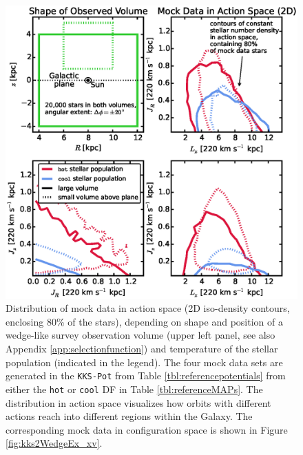 \documentclass[iop,revtex4,numberedappendix,appendixfloats]{emulateapj}
\begin{document}
\begin{figure}[!htbp]
\centering
\begin{minipage}{0.48\textwidth}
\centering
\includegraphics[width=\textwidth]{kks2WedgeEx_mockdata_actions.eps}
\caption{Distribution of mock data in action space (2D iso-density contours, enclosing 80\% of the stars), depending on shape and position of a wedge-like survey observation volume (upper left panel, see also Appendix \ref{app:selectionfunction}) and temperature of the stellar population (indicated in the legend). The four mock data sets are generated in the \texttt{KKS-Pot} from Table \ref{tbl:referencepotentials} from either the \texttt{hot} or \texttt{cool} DF in Table \ref{tbl:referenceMAPs}. The distribution in action space visualizes how orbits with different actions reach into different regions within the Galaxy. The corresponding mock data in configuration space is shown in Figure \ref{fig:kks2WedgeEx_xv}.} 
\label{fig:kks2WedgeEx_actions}
\end{minipage}
\hfill
\begin{minipage}{0.48\textwidth}
\centering

\end{minipage}
\end{figure}
\end{document}
